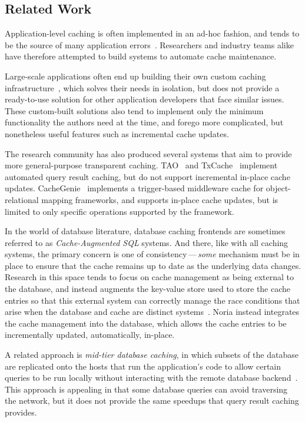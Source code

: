 \subsection{Related Work}

Application-level caching is often implemented in an ad-hoc fashion, and tends
to be the source of many application errors~\cite{ad-hoc-caching}. Researchers
and industry teams alike have therefore attempted to build systems to automate
cache maintenance.

Large-scale applications often end up building their own custom caching
infrastructure~\cite{facebook-memcache, flannel}, which solves their needs in
isolation, but does not provide a ready-to-use solution for other application
developers that face similar issues. These custom-built solutions also tend to
implement only the minimum functionality the authors need at the time, and
forego more complicated, but nonetheless useful features such as incremental
cache updates.

The research community has also produced several systems that aim to provide
more general-purpose transparent caching. TAO~\cite{tao} and
TxCache~\cite{txcache} implement automated query result caching, but do not
support incremental in-place cache updates. CacheGenie~\cite{cachegenie}
implements a trigger-based middleware cache for object-relational mapping
frameworks, and supports in-place cache updates, but is limited to only specific
operations supported by the framework.

In the world of database literature, database caching frontends are sometimes
referred to as \textit{Cache-Augmented SQL} systems. And there, like with all
caching systems, the primary concern is one of consistency\,---\,\emph{some}
mechanism must be in place to ensure that the cache remains up to date as the
underlying data changes. Research in this space tends to focus on cache
management as being external to the database, and instead augments the key-value
store used to store the cache entries so that this external system can correctly
manage the race conditions that arise when the database and cache are distinct
systems~\cite{facebook-memcache, casql-consistency, casql-consistency-thesis}.
Noria instead integrates the cache management into the database, which allows
the cache entries to be incrementally updated, automatically, in-place.

A related approach is \textit{mid-tier database caching}, in which subsets of
the database are replicated onto the hosts that run the application's code to
allow certain queries to be run locally without interacting with the remote
database backend~\cite{mtcache}. This approach is appealing in that some
database queries can avoid traversing the network, but it does not provide the
same speedups that query result caching provides.

